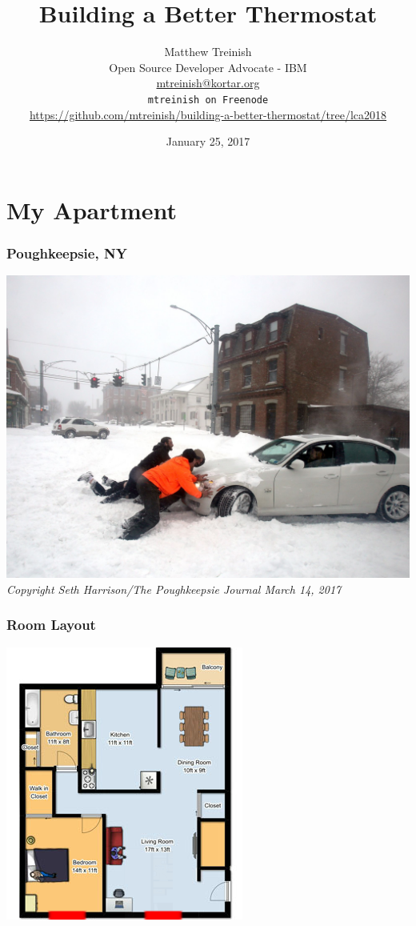 \documentclass[aspectratio=169,11pt,hyperref={colorlinks=true}]{beamer}
\author[Matthew Treinish]{%
    \texorpdfstring{%
        \centering
        Matthew Treinish\\
        Open Source Developer Advocate - IBM \\
        \href{mailto:mtreinish@kortar.org}{mtreinish@kortar.org}\\
        \texttt{mtreinish on Freenode}\\
        \href{https://github.com/mtreinish/building-a-better-thermostat/tree/lca2018}{https://github.com/mtreinish/building-a-better-thermostat/tree/lca2018}
   }
   {Matthew Treinish}
}
\date{January 25, 2017}
\title{Building a Better Thermostat}
\begin{document}
\titlepage

\section{My Apartment}
\begin{frame}
    \frametitle{Poughkeepsie, NY}
    \begin{center}
        \includegraphics[height=.85\textheight]{snow.jpg}\\
        \footnotesize
        \textit{Copyright Seth Harrison/The Poughkeepsie Journal March 14, 2017}
    \end{center}
\end{frame}

\begin{frame}
    \frametitle{Room Layout}
    \begin{center}
    \includegraphics[height=.85\textheight]{floorplan.png}
    \end{center}
\end{frame}
\end{document}
